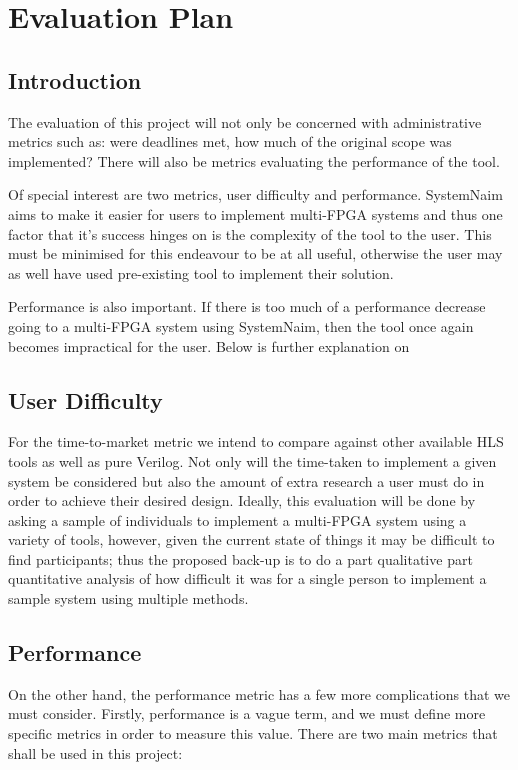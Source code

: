 \chapter{Evaluation Plan}
\label{chap:Eval}

\section{Introduction}
The evaluation of this project will not only be concerned with administrative metrics such as: were deadlines met, how much of the original scope was implemented? There will also be metrics evaluating the performance of the tool.

Of special interest are two metrics, user difficulty and performance. SystemNaim aims to make it easier for users to implement multi-FPGA systems and thus one factor that it's success hinges on is the complexity of the tool to the user. This must be minimised for this endeavour to be at all useful, otherwise the user may as well have used pre-existing tool to implement their solution.

Performance is also important. If there is too much of a performance decrease going to a multi-FPGA system using SystemNaim, then the tool once again becomes impractical for the user. Below is further explanation on 

\section{User Difficulty}
\label{sec:ud}
For the time-to-market metric we intend to compare against other available HLS tools as well as pure Verilog. Not only will the time-taken to implement a given system be considered but also the amount of extra research a user must do in order to achieve their desired design. Ideally, this evaluation will be done by asking a sample of individuals to implement a multi-FPGA system using a variety of tools, however, given the current state of things it may be difficult to find participants; thus the proposed back-up is to do a part qualitative part quantitative analysis of how difficult it was for a single person to implement a sample system using multiple methods.

\section{Performance}
On the other hand, the performance metric has a few more complications that we must consider. Firstly, performance is a vague term, and we must define more specific metrics in order to measure this value. There are two main metrics that shall be used in this project: 

